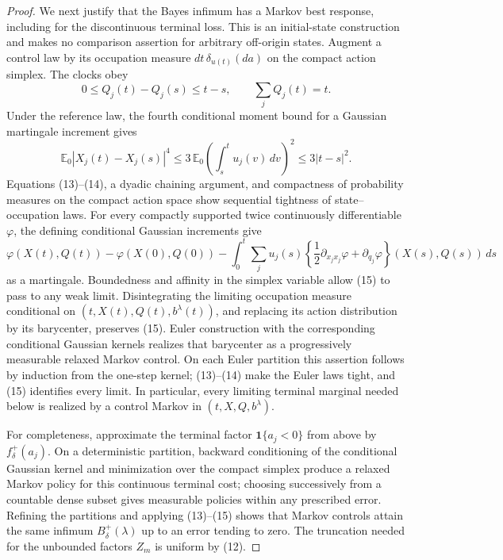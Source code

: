 \documentclass{article}
\begin{document}
\begin{proof}
We next justify that the Bayes infimum has a Markov best response, including for the discontinuous terminal loss.  This is an initial-state construction and makes no comparison assertion for arbitrary off-origin states.  Augment a control law by its occupation measure \(dt\,\delta_{u(t)}(da)\) on the compact action simplex.  The clocks obey
\[
 0\leq Q_j(t)-Q_j(s)\leq t-s,
 \qquad \sum_jQ_j(t)=t.                                         \tag{13}
\]
Under the reference law, the fourth conditional moment bound for a Gaussian martingale increment gives
\[
 \mathbb E_0|X_j(t)-X_j(s)|^4
 \leq3\,\mathbb E_0\!\left(\int_s^tu_j(v)\,dv\right)^2
 \leq3|t-s|^2.                                                   \tag{14}
\]
Equations (13)--(14), a dyadic chaining argument, and compactness of probability measures on the compact action space show sequential tightness of state--occupation laws.  For every compactly supported twice continuously differentiable \(\varphi\), the defining conditional Gaussian increments give
\[
 \varphi(X(t),Q(t))-\varphi(X(0),Q(0))
 -\int_0^t\sum_j u_j(s)
   \left\{\frac12\partial_{x_jx_j}\varphi+
                  \partial_{q_j}\varphi\right\}(X(s),Q(s))\,ds
                                                                    \tag{15}
\]
as a martingale.  Boundedness and affinity in the simplex variable allow (15) to pass to any weak limit.  Disintegrating the limiting occupation measure conditional on \((t,X(t),Q(t),b^\lambda(t))\), and replacing its action distribution by its barycenter, preserves (15).  Euler construction with the corresponding conditional Gaussian kernels realizes that barycenter as a progressively measurable relaxed Markov control.  On each Euler partition this assertion follows by induction from the one-step kernel; (13)--(14) make the Euler laws tight, and (15) identifies every limit.  In particular, every limiting terminal marginal needed below is realized by a control Markov in \((t,X,Q,b^\lambda)\).

For completeness, approximate the terminal factor \(\mathbf1\{a_j<0\}\) from above by \(f_\delta^+(a_j)\).  On a deterministic partition, backward conditioning of the conditional Gaussian kernel and minimization over the compact simplex produce a relaxed Markov policy for this continuous terminal cost; choosing successively from a countable dense subset gives measurable policies within any prescribed error.  Refining the partitions and applying (13)--(15) shows that Markov controls attain the same infimum \(B_\delta^+(\lambda)\) up to an error tending to zero.  The truncation needed for the unbounded factors \(Z_m\) is uniform by (12).


\end{proof}
\end{document}

